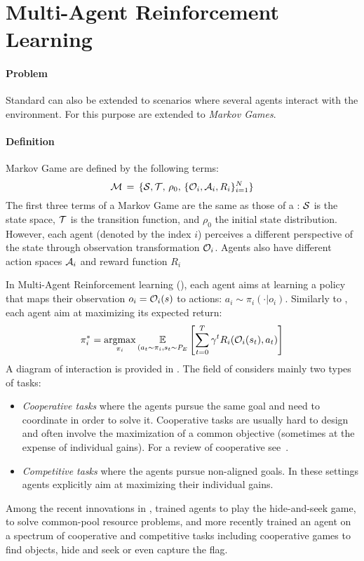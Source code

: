 \section{Multi-Agent Reinforcement Learning}
\label{sec:background_marl}
\paragraph{Problem}

Standard \rl can also be extended to scenarios where several agents interact with the environment. For this purpose \mdps are extended to \textit{Markov Games}.
\begin{tcolorbox}
\small
\paragraph{Definition}
\gls{Markov Game} are defined by the following terms:
\begin{equation}
	\mathcal{M}\,=\,\{\mathcal{S},\mathcal{T},\,\rho_0,\,\{\mathcal{O}_i,\mathcal{A}_i,R_i\}_{i=1}^N\}
	\label{eq:markov_game}	
\end{equation}
The first three terms of a Markov Game are the same as those of a \mdp: $\mathcal{S}$ is the state space, $\mathcal{T}$ is the transition function, and $\rho_0$ the initial state distribution. However, each agent (denoted by the index $i$) perceives a different perspective of the state through observation transformation $\mathcal{O}_i$. Agents also have different action spaces $\mathcal{A}_i$ and reward function $R_i$
\end{tcolorbox}

In Multi-Agent Reinforcement learning (\marl), each agent aims at learning a policy that maps their observation $o_i=\mathcal{O}_i(s)$ to actions: $a_i \sim \pi_i(\cdot|o_i)$. Similarly to \rl, each agent aim at maximizing its expected return:
\begin{equation}
	\pi_i^* = \operatorname*{argmax}_{\pi_i} \underset{(a_t\sim\pi_i, s_t \sim P_E}{\mathbb{E}}\left[\sum_{t=0}^T\gamma^tR_i(\mathcal{O}_i(s_t),a_t)\right]
\end{equation}
A diagram of interaction is provided in . The field of \marl considers mainly two types of tasks:
\begin{itemize}[noitemsep]
\item \textit{Cooperative tasks} where the agents pursue the same goal and need to coordinate in order to solve it. Cooperative tasks are usually hard to design and often involve the maximization of a common objective (sometimes at the expense of individual gains). For a review of cooperative \marl see~\citet{OroojlooyJadid2019cooperative}.
\item \textit{Competitive tasks} where the agents pursue non-aligned goals. In these settings agents explicitly aim at maximizing their individual gains. 
\end{itemize}
Among the recent innovations in \marl, \citet{Baker2020Emergent} trained agents to play the hide-and-seek game, \citet{perolat2017commonpool} to solve common-pool resource problems, and more recently \citet{team2021open} trained an agent on a spectrum of cooperative and competitive tasks including cooperative games to find objects, hide and seek or even capture the flag.

